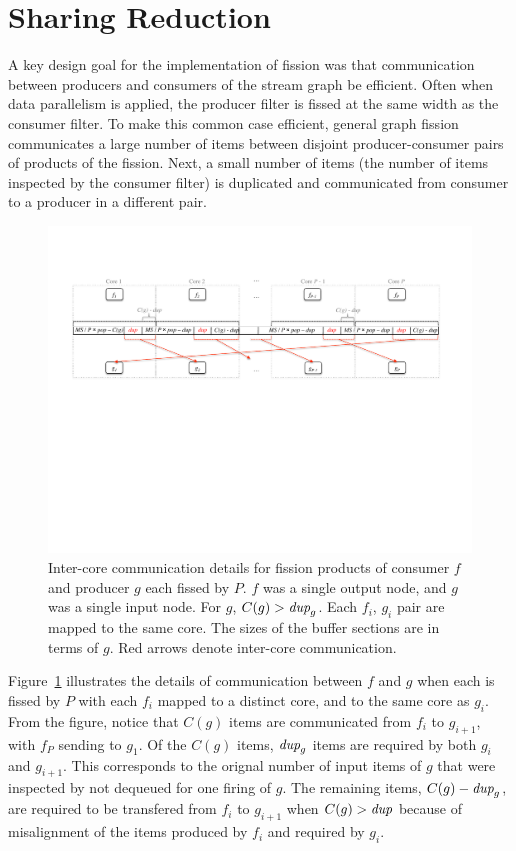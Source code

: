 \section{Sharing Reduction}

A key design goal for the implementation of fission was that
communication between producers and consumers of the stream graph be
efficient.  Often when data parallelism is applied, the producer
filter is fissed at the same width as the consumer filter.  To make
this common case efficient, general graph fission communicates a large
number of items between disjoint producer-consumer pairs of products
of the fission.  Next, a small number of items (the number of items
inspected by the consumer filter) is duplicated and communicated from
consumer to a producer in a different pair.

\begin{figure}[t]
\centering
\includegraphics[width=\textwidth]{figures/remaining-dup-case.pdf}
\caption[Extra inter-core communication when $C(g) > \mt{dup}_g$.]
{Inter-core communication details for fission products of consumer $f$
  and producer $g$ each fissed by $P$.  $f$ was a single output node,
  and $g$ was a single input node.  For $g$, $C(g) > \mt{dup}_g$.
  Each $f_i$, $g_i$ pair are mapped to the same core.  The sizes of
  the buffer sections are in terms of $g$. Red arrows denote
  inter-core communication.  \label{fig:remaining-dup}}
\end{figure}

Figure~\ref{fig:remaining-dup} illustrates the details of
communication between $f$ and $g$ when each is fissed by $P$ with each
$f_i$ mapped to a distinct core, and to the same core as $g_i$.  From
the figure, notice that $C(g)$ items are communicated from $f_i$ to
$g_{i+ 1}$, with $f_P$ sending to $g_1$.  Of the $C(g)$ items,
$\mbox{\it dup}_g$ items are required by both $g_i$ and $g_{i+1}$.  This
corresponds to the orignal number of input items of $g$ that were
inspected by not dequeued for one firing of $g$.  The remaining items,
$C(g) - \mbox{\it dup}_g$, are required to be transfered from $f_i$ to
$g_{i+1}$ when $C(g) > \mbox{\it dup}$ because of misalignment of the items
produced by $f_i$ and required by $g_i$.

